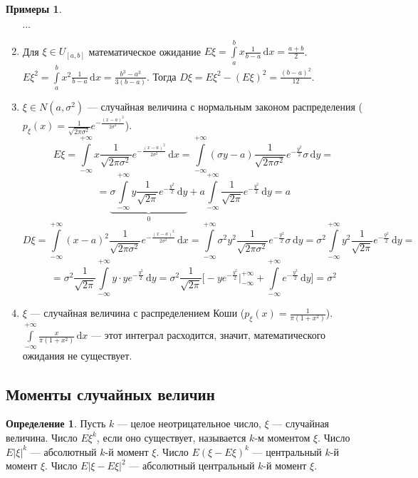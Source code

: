 \documentclass[11pt,openany,a4paper]{scrartcl}
\theoremstyle{plain}
\theoremstyle{definition}
\newtheorem{definition}[theorem]{Определение}
\newtheorem{examples}[theorem]{Примеры}
\newcommand{\dif}{\, \mathrm d}
\begin{document}
\begin{examples}
\begin{enumerate}
        $\cdots$
        \item Для $\xi \in U_{[a,b]}$ математическое ожидание $E\xi =
        \int\limits_a^b x\frac{1}{b-a}\dif x = \frac{a + b}{2}$. $E\xi^2 =
        \int\limits_a^b x^2\frac{1}{b-a}\dif x = \frac{b^3 - a^3}{3(b-a)}$.
        Тогда $D\xi = E\xi^2 - (E\xi)^2 = \frac{(b-a)^2}{12}$.
        \item $\xi \in N(a, \sigma^2)$ — случайная величина с нормальным
        законом распределения ($p_\xi(x) =
        \frac{1}{\sqrt{2\pi\sigma^2}}e^{-\frac{(x-a)^2}{2\sigma^2}}$).
        $$
        E\xi = \int\limits_{-\infty}^{+\infty}x\frac{1}{\sqrt{2\pi\sigma^2}}
        e^{-\frac{(x-a)^2}{2\sigma^2}}\dif x =
        \int\limits_{-\infty}^{+\infty}
        (\sigma y - a)\frac{1}{\sqrt{2\pi\sigma^2}}
        e^{-\frac{y^2}{2}}\sigma\dif y =
        $$
        $$
        =\underbrace{\sigma \int\limits_{-\infty}^{+\infty}
        y\frac{1}{\sqrt{2\pi}}e^{-\frac{y^2}{2}} \dif y}_0 +
        a\int\limits_{-\infty}^{+\infty}
        \frac{1}{\sqrt{2\pi}}e^{-\frac{y^2}{2}} \dif y = a
        $$
        $$
        D\xi = \int\limits_{-\infty}^{+\infty}
        (x-a)^2\frac{1}{\sqrt{2\pi\sigma^2}}e^{-\frac{(x-a)^2}{2\sigma^2}} \dif x
        = \int\limits_{-\infty}^{+\infty}
        \sigma^2 y^2 \frac{1}{\sqrt{2\pi\sigma^2}}e^{-\frac{y^2}{2}}\sigma \dif y
        = \sigma^2 \int\limits_{-\infty}^{+\infty}
        y^2 \frac{1}{\sqrt{2\pi}}e^{-\frac{y^2}{2}}\dif y =
        $$
        $$
        = \sigma^2 \frac{1}{\sqrt{2\pi}} \int\limits_{-\infty}^{+\infty}
        y\cdot ye^{-\frac{y^2}{2}}\dif y = \sigma^2 \frac{1}{\sqrt{2\pi}}
        \bigg[ -ye^{-\frac{y^2}{2}}\bigg|_{-\infty}^{+\infty} +
        \int\limits_{-\infty}^{+\infty}e^{-\frac{y^2}{2}}\dif y\bigg] = \sigma^2
        $$
        \item $\xi$ — случайная величина с распределением Коши
        ($p_\xi(x) = \frac{1}{\pi(1 + x^2)}$).
        $\int\limits_{-\infty}^{+\infty} \frac{x}{\pi(1 + x^2)}\dif x$ — этот 
        интеграл расходится, значит, математического ожидания не существует.
    \end{enumerate}
\end{examples}

\subsection{Моменты случайных величин}

\begin{definition}
    Пусть $k$ — целое неотрицательное число, $\xi$ — случайная величина.
    Число $E\xi^k$, если оно существует, называется $k$-м моментом $\xi$.
    Число $E|\xi|^k$ — абсолютный $k$-й момент $\xi$.
    Число $E(\xi - E\xi)^k$ — центральный $k$-й момент $\xi$.
    Число $E|\xi - E\xi|^2$ — абсолютный центральный $k$-й момент $\xi$.
\end{definition}
\end{document}

